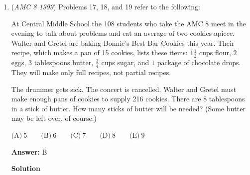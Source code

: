 \begin{enumerate}
 \textbf{Answer: }E



\textbf{Solution 1}

If $108$ students eat $2$ cookies on average, there will need to be $108\cdot 2 = 216$ cookies.  But with the smaller attendance, you will only need $100\% - 25\% = 75\%$ of these cookies, or $75\% \cdot 216 = 0.75\cdot 216 = 162$ cookies.

 $162$ cookies requires $\frac{162}{15} = 10.8$ batches.  However, since half-batches are forbidden, we must round up to get $\left\lceil \frac{162}{15} \right\rceil = 11$ batches, and the correct answer is $\boxed{E}$.

 



\textbf{Solution 2}

If there were $108$ students before, with the $25\%$ of students missing, there will be $75\%$ of $108$ students left.  This is $75\% \cdot 108 =  0.75 \cdot 108 = 81$ students.  These students eat $81 \cdot 2 = 162$ cookies.  Follow the logic of the second paragraph above to find that there needs to be $11$ batches, and the correct answer is $\boxed{E}$.

 


 


	\item (\textit{AMC 8 1999}) Problems 17, 18, and 19 refer to the following:


 At Central Middle School the 108 students who take the AMC 8 meet in the evening to talk about problems and eat an average of two cookies apiece. Walter and Gretel are baking Bonnie's Best Bar Cookies this year. Their recipe, which makes a pan of 15 cookies, lists these items: $1\frac{1}{2}$ cups flour, $2$ eggs, $3$ tablespoons butter, $\frac{3}{4}$ cups sugar, and $1$ package of chocolate drops. They will make only full recipes, not partial recipes.


 The drummer gets sick. The concert is cancelled. Walter and Gretel must make enough pans of cookies to supply 216 cookies. There are 8 tablespoons in a stick of butter. How many sticks of butter will be needed? (Some butter may be left over, of course.)


 $\text{(A)}\ 5 \qquad \text{(B)}\ 6 \qquad \text{(C)}\ 7 \qquad \text{(D)}\ 8 \qquad \text{(E)}\ 9$

 \textbf{Answer: }B



\textbf{Solution}


\end{enumerate}

